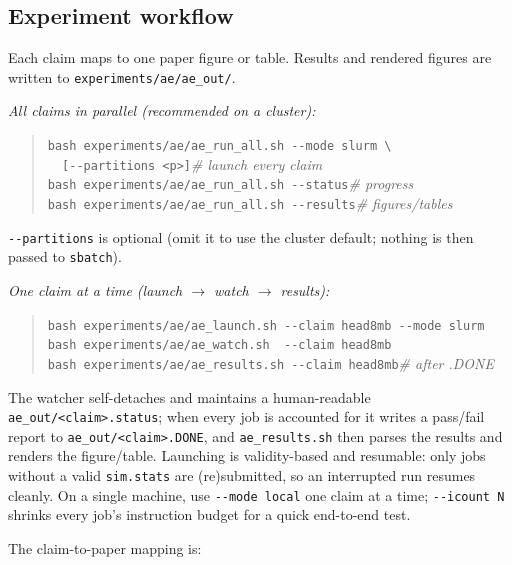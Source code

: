 \subsection{Experiment workflow}

Each claim maps to one paper figure or table. Results and rendered figures are
written to \texttt{experiments/ae/ae\_out/}.

\emph{All claims in parallel (recommended on a cluster):}
\begin{quote}\small
\texttt{bash experiments/ae/ae\_run\_all.sh -{}-mode slurm \textbackslash}\\
\texttt{\ \ [-{}-partitions <p>]}\qquad\textit{\# launch every claim}\\
\texttt{bash experiments/ae/ae\_run\_all.sh -{}-status}\quad\textit{\# progress}\\
\texttt{bash experiments/ae/ae\_run\_all.sh -{}-results}\quad\textit{\# figures/tables}
\end{quote}
\texttt{-{}-partitions} is optional (omit it to use the cluster default; nothing
is then passed to \texttt{sbatch}).

\emph{One claim at a time (launch $\rightarrow$ watch $\rightarrow$ results):}
\begin{quote}\small
\texttt{bash experiments/ae/ae\_launch.sh\ -{}-claim head8mb -{}-mode slurm}\\
\texttt{bash experiments/ae/ae\_watch.sh\ \ -{}-claim head8mb}\\
\texttt{bash experiments/ae/ae\_results.sh -{}-claim head8mb}\quad\textit{\# after .DONE}
\end{quote}
The watcher self-detaches and maintains a human-readable
\texttt{ae\_out/<claim>.status}; when every job is accounted for it writes a
pass/fail report to \texttt{ae\_out/<claim>.DONE}, and \texttt{ae\_results.sh}
then parses the results and renders the figure/table. Launching is
validity-based and resumable: only jobs without a valid \texttt{sim.stats} are
(re)submitted, so an interrupted run resumes cleanly. On a single machine, use
\texttt{-{}-mode local} one claim at a time; \texttt{-{}-icount N} shrinks every
job's instruction budget for a quick end-to-end test.

The claim-to-paper mapping is:


